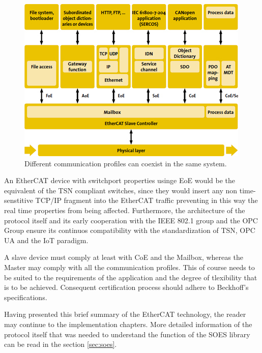\begin{figure}[ht]
    \centering
    \includegraphics[width=.65\textwidth]{imgs/intro-ecatprofiles.jpg}
    \caption{Different communication profiles can coexist in the same system.}
    \label{fig:ecatprofiles}
\end{figure}

An EtherCAT device with switchport properties usinge EoE would be the equivalent of the TSN compliant
switches, since they would insert any non time-senstitive TCP/IP fragment into the EtherCAT traffic preventing
in this way the real time properties from being affected. Furthermore, the architecture of the protocol itself and
its early cooperation with the IEEE 802.1 group and the OPC Group ensure its continuos compatibility with the
standardization of TSN, OPC UA and the IoT paradigm.\cite{beckhoff_compatibility}%

A slave device must comply at least with CoE and the Mailbox, whereas the Master may comply with all the communication profiles. This of course
needs to be suited to the requirements of the application and the degree of tlexibility that is to be achieved. Consequent certification process
should adhere to Beckhoff's specifications.\cite{beckhoff_slavetutorial} %

Having presented this brief summary of the EtherCAT technology, the reader may continue to the implementation chapters. 
More detailed information of the protocol itself that was needed to understand the function of the SOES library
can be read in the section \ref{sec:soes}.




